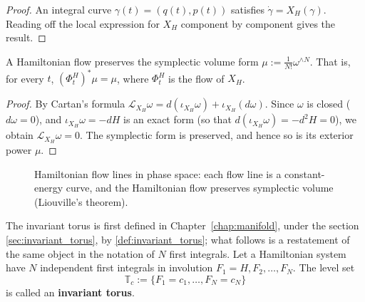 \begin{proof}
An integral curve $\gamma(t) = (q(t), p(t))$ satisfies $\dot{\gamma} = X_H(\gamma)$. Reading off the local expression for $X_H$ component by component gives the result.
\end{proof}

\begin{theorem}\label{thm:ps_liouville}
A Hamiltonian flow preserves the symplectic volume form $\mu := \frac{1}{N!}\omega^{\wedge N}$. That is, for every $t$, $(\Phi_t^H)^*\mu = \mu$, where $\Phi_t^H$ is the flow of $X_H$.
\end{theorem}

\begin{proof}
By Cartan's formula $\mathcal{L}_{X_H}\omega = d(\iota_{X_H}\omega) + \iota_{X_H}(d\omega)$. Since $\omega$ is closed ($d\omega=0$), and $\iota_{X_H}\omega = -dH$ is an exact form (so that $d(\iota_{X_H}\omega) = -d^2 H = 0$), we obtain $\mathcal{L}_{X_H}\omega = 0$. The symplectic form is preserved, and hence so is its exterior power $\mu$.
\end{proof}

\begin{figure}[htbp]
\centering
{}
\caption{Hamiltonian flow lines in phase space: each flow line is a constant-energy curve, and the Hamiltonian flow preserves symplectic volume (Liouville's theorem).}
\label{fig:ps_hamiltonian_flow}
\end{figure}

\begin{definition}\label{def:ps_invariant_torus}
The invariant torus is first defined in Chapter~\ref{chap:manifold}, under the section \cref{sec:invariant_torus}, by \cref{def:invariant_torus}; what follows is a restatement of the same object in the notation of $N$ first integrals.
Let a Hamiltonian system have $N$ independent first integrals in involution $F_1=H,F_2,\dots,F_N$. The level set
\[
\mathbb{T}_{c} := \{F_1=c_1, \dots, F_N=c_N\}
\]
is called an \textbf{invariant torus}.
\end{definition}

